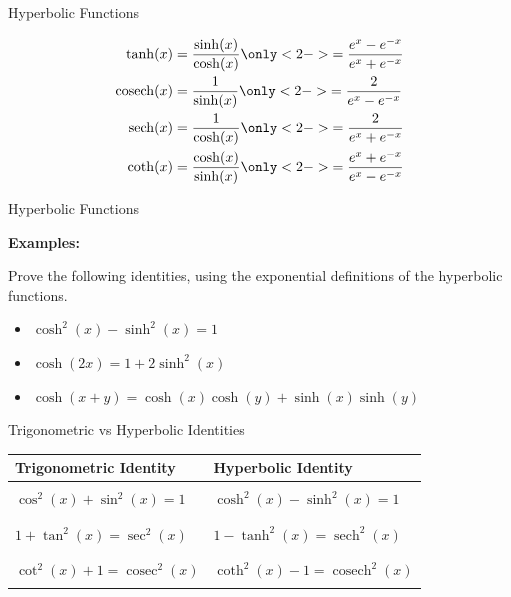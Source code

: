 \documentclass[10pt]{beamer}
\DeclareMathOperator{\sech}{sech}
\DeclareMathOperator{\cosech}{cosech}
\DeclareMathOperator{\cosec}{cosec}
\begin{document}
\begin{frame}{Hyperbolic Functions}

	\begin{align*}
		\tanh(x) &= \frac{\sinh(x)}{\cosh(x)} \only<2-> {= \frac{e^x - e^{-x}}{e^x + e^{-x}}} \\
		\cosech(x) &= \frac{1}{\sinh(x)} \only<2-> {= \frac{2}{e^x - e^{-x}}} \\
		\sech(x) &= \frac{1}{\cosh(x)} \only<2-> {= \frac{2}{e^x + e^{-x}}} \\
		\coth(x) &= \frac{\cosh(x)}{\sinh(x)} \only<2-> {= \frac{e^x + e^{-x}}{e^x - e^{-x}}}
	\end{align*}

\end{frame}

\begin{frame}{Hyperbolic Functions}

	\textbf{Examples:}
	
	Prove the following identities, using the exponential definitions of the hyperbolic functions.
	
	\begin{itemize}
		\item $\cosh^2(x) - \sinh^2(x) = 1$
		\item $\cosh (2x) = 1 + 2\sinh^2(x)$
		\item $\cosh(x+y) = \cosh(x)\cosh(y) + \sinh(x)\sinh(y)$
	\end{itemize}

\end{frame}

\begin{frame}{Trigonometric vs Hyperbolic Identities}
	\begin{center}
	    \begin{tabular}{| l | l |}
	    \hline
	    Trigonometric Identity & Hyperbolic Identity \\ 
	    \hline
	    & \\ $\cos^2(x) + \sin^2(x) = 1$ & $\cosh^2(x) - \sinh^2(x) = 1$ \\ & \\
	    \hline
	    & \\ $1 + \tan^2(x) = \sec^2(x)$ & $1 - \tanh^2(x) = \sech^2(x)$ \\ & \\
	    \hline 
	    & \\ $\cot^2(x) + 1 = \cosec^2(x)$ & $\coth^2(x) - 1 = \cosech^2(x)$ \\ & \\
	    \hline
	    \end{tabular}
	\end{center}
\end{frame}
\end{document}
